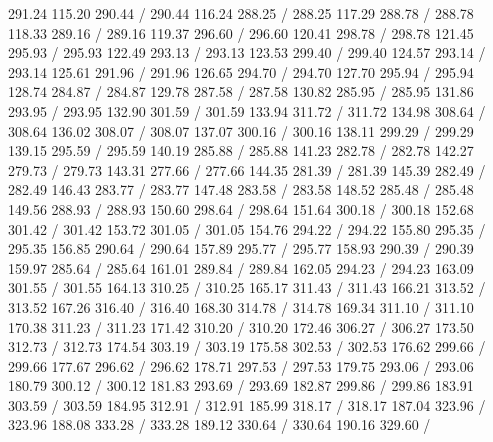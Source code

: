 { 291.24 115.20 290.44 /
 290.44 116.24 288.25 /
 288.25 117.29 288.78 /
 288.78 118.33 289.16 /
 289.16 119.37 296.60 /
 296.60 120.41 298.78 /
 298.78 121.45 295.93 /
 295.93 122.49 293.13 /
 293.13 123.53 299.40 /
 299.40 124.57 293.14 /
 293.14 125.61 291.96 /
 291.96 126.65 294.70 /
 294.70 127.70 295.94 /
 295.94 128.74 284.87 /
 284.87 129.78 287.58 /
 287.58 130.82 285.95 /
 285.95 131.86 293.95 /
 293.95 132.90 301.59 /
 301.59 133.94 311.72 /
 311.72 134.98 308.64 /
 308.64 136.02 308.07 /
 308.07 137.07 300.16 /
 300.16 138.11 299.29 /
 299.29 139.15 295.59 /
 295.59 140.19 285.88 /
 285.88 141.23 282.78 /
 282.78 142.27 279.73 /
 279.73 143.31 277.66 /
 277.66 144.35 281.39 /
 281.39 145.39 282.49 /
 282.49 146.43 283.77 /
 283.77 147.48 283.58 /
 283.58 148.52 285.48 /
 285.48 149.56 288.93 /
 288.93 150.60 298.64 /
 298.64 151.64 300.18 /
 300.18 152.68 301.42 /
 301.42 153.72 301.05 /
 301.05 154.76 294.22 /
 294.22 155.80 295.35 /
 295.35 156.85 290.64 /
 290.64 157.89 295.77 /
 295.77 158.93 290.39 /
 290.39 159.97 285.64 /
 285.64 161.01 289.84 /
 289.84 162.05 294.23 /
 294.23 163.09 301.55 /
 301.55 164.13 310.25 /
 310.25 165.17 311.43 /
 311.43 166.21 313.52 /
 313.52 167.26 316.40 /
 316.40 168.30 314.78 /
 314.78 169.34 311.10 /
 311.10 170.38 311.23 /
 311.23 171.42 310.20 /
 310.20 172.46 306.27 /
 306.27 173.50 312.73 /
 312.73 174.54 303.19 /
 303.19 175.58 302.53 /
 302.53 176.62 299.66 /
 299.66 177.67 296.62 /
 296.62 178.71 297.53 /
 297.53 179.75 293.06 /
 293.06 180.79 300.12 /
 300.12 181.83 293.69 /
 293.69 182.87 299.86 /
 299.86 183.91 303.59 /
 303.59 184.95 312.91 /
 312.91 185.99 318.17 /
 318.17 187.04 323.96 /
 323.96 188.08 333.28 /
 333.28 189.12 330.64 /
 330.64 190.16 329.60 /
}
